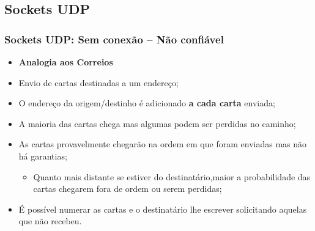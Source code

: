 \documentclass[hyperref={pdfpagelabels=false},table]{beamer}
\begin{document}
\subsection{Sockets UDP}

\begin{frame}[t]
	\frametitle{Sockets UDP: Sem conexão – Não confiável}
	\begin{itemize}
		\item \textbf{Analogia aos Correios}
		\item Envio de cartas destinadas a um endereço;
		\item O endereço da origem/destinho é adicionado \textbf{a cada carta} enviada;
		\item A maioria das cartas chega mas algumas podem ser perdidas no caminho;
		\item As cartas provavelmente chegarão na ordem em que foram enviadas mas não há garantias;
		\begin{itemize}
			\item Quanto mais distante se estiver do destinatário,maior a probabilidade das cartas chegarem fora de ordem ou serem perdidas;
		\end{itemize}
		\item É possível numerar as cartas e o destinatário lhe escrever solicitando aquelas que não recebeu.
		\end{itemize}
\end{frame}
\end{document}
